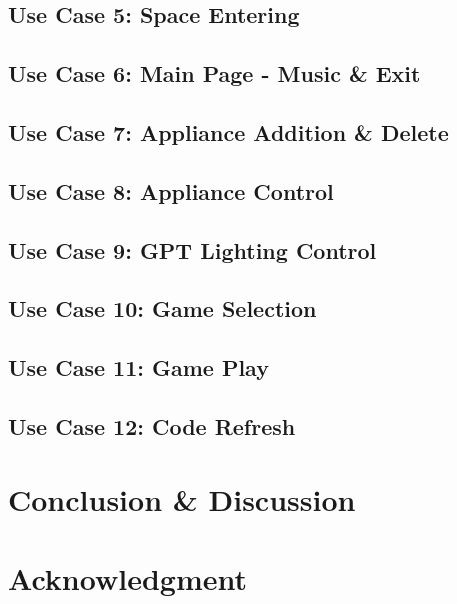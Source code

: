 \documentclass[conference]{IEEEtran}
\begin{document}
    \subsection{Use Case 5: Space Entering}
    \subsection{Use Case 6: Main Page - Music \& Exit}
    \subsection{Use Case 7: Appliance Addition \& Delete}
    \subsection{Use Case 8: Appliance Control}
    \subsection{Use Case 9: GPT Lighting Control}
    \subsection{Use Case 10: Game Selection}
    \subsection{Use Case 11: Game Play}
    \subsection{Use Case 12: Code Refresh}
\section{Conclusion \& Discussion}

\section*{Acknowledgment}

\end{document}
